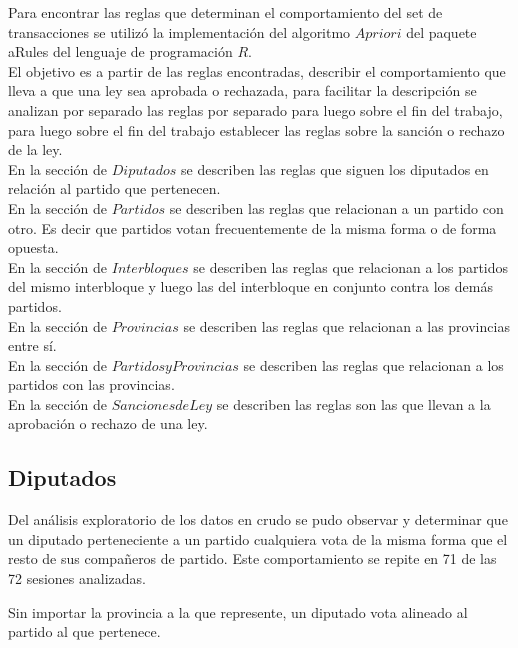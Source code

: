 \documentclass{endm}
\begin{document}
Para encontrar las reglas que determinan el comportamiento del set de transacciones se utilizó la implementación del algoritmo $Apriori$ del paquete aRules del lenguaje de programación $R$.\\

El objetivo es a partir de las reglas encontradas, describir el comportamiento que lleva a que una ley sea aprobada o rechazada, para facilitar la descripción se analizan por separado las reglas por separado para luego sobre el fin del trabajo, para luego sobre el fin del trabajo establecer las reglas sobre la sanción o rechazo de la ley.\\

En la sección de $Diputados$ se describen las reglas que siguen los diputados en relación al partido que pertenecen.\\

En la sección de $Partidos$ se describen las reglas que relacionan a un partido con otro. Es decir que partidos votan frecuentemente de la misma forma o de forma opuesta.\\

En la sección de $Interbloques$ se describen las reglas que relacionan a los partidos del mismo interbloque y luego las del interbloque en conjunto contra los demás partidos.\\

En la sección de $Provincias$ se describen las reglas que relacionan a las provincias entre sí.\\

En la sección de $Partidos y Provincias$ se describen las reglas que relacionan a los partidos con las provincias.\\

En la sección de $Sanciones de Ley$ se describen las reglas son las que llevan a la aprobación o rechazo de una ley.

\subsection{Diputados}

Del análisis exploratorio de los datos en crudo se pudo observar y determinar que un diputado perteneciente a un partido cualquiera vota de la misma forma que el resto de sus compañeros de partido. Este comportamiento se repite en 71 de las 72 sesiones analizadas.

Sin importar la provincia a la que represente, un diputado vota alineado al partido al que pertenece.
\end{document}
